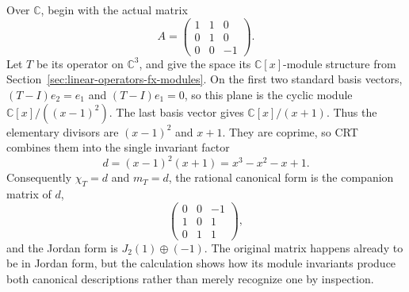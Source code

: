 \begin{example}
Over \(\mathbb C\), begin with the actual matrix
\[
A=\begin{pmatrix}1&1&0\\0&1&0\\0&0&-1\end{pmatrix}.
\]
Let \(T\) be its operator on \(\mathbb C^3\), and give the space its
\(\mathbb C[x]\)-module structure from
Section~\ref{sec:linear-operators-fx-modules}. On the first two standard
basis vectors, \((T-I)e_2=e_1\) and \((T-I)e_1=0\), so this plane is the
cyclic module \(\mathbb C[x]/((x-1)^2)\). The last basis vector gives
\(\mathbb C[x]/(x+1)\). Thus the elementary divisors are
\((x-1)^2\) and \(x+1\). They are coprime, so CRT combines them into the
single invariant factor
\[
d=(x-1)^2(x+1)=x^3-x^2-x+1.
\]
Consequently \(\chi_T=d\) and \(m_T=d\), the rational canonical form is
the companion matrix of \(d\),
\[
\begin{pmatrix}0&0&-1\\1&0&1\\0&1&1\end{pmatrix},
\]
and the Jordan form is \(J_2(1)\oplus(-1)\). The original matrix happens
already to be in Jordan form, but the calculation shows how its module
invariants produce both canonical descriptions rather than merely recognize
one by inspection.
\end{example}

